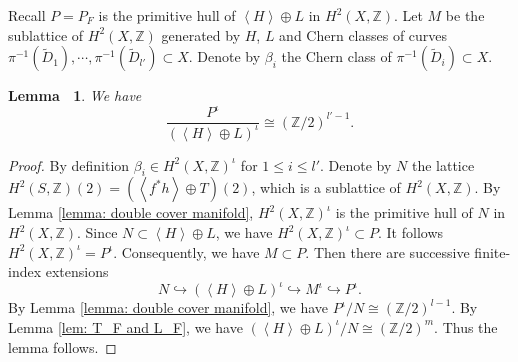 \documentclass[12pt,reqno,a4paper]{amsart}
\newtheorem{lem}[thm]{Lemma~}
\theoremstyle{remark}
\theoremstyle{definition}
\begin{document}
Recall $P=P_F$ is the primitive hull of $\left\langle H\right\rangle \oplus L$ in $H^2(X,\mathbb{Z})$.
Let $M$ be the sublattice of $H^2(X,\mathbb{Z})$ generated by $H$, $L$ and Chern classes of curves $\pi^{-1}(\widetilde{D}_1),\cdots, \pi^{-1}(\widetilde{D}_{l'}) \subset X$.
Denote by $\beta_i$ the Chern class of $\pi^{-1}(\widetilde{D}_i)\subset X$. 


        
\begin{lem}
\label{lem: saturation of inv part of P}
    We have
    \begin{equation*}
        \frac{P^{\iota}}{(\left\langle H \right\rangle\oplus L)^{\iota}} \cong (\mathbb{Z}/2)^{l'-1}.
    \end{equation*}
\end{lem}
\begin{proof}
By definition $\beta_i\in H^2(X, \mathbb{Z})^\iota$ for $1\le i\le l'$. 
Denote by $N$ the lattice $H^2(S,\mathbb{Z})(2)=(\left\langle f^*h \right\rangle \oplus T)(2)$, which is a sublattice of $H^2(X, \mathbb{Z})$.
By Lemma \ref{lemma: double cover manifold}, $H^2(X,\mathbb{Z})^{\iota}$ is the primitive hull of $N$ in $H^2(X, \mathbb{Z})$.
Since $N\subset \left\langle H\right\rangle \oplus L$, we have $H^2(X,\mathbb{Z})^{\iota}\subset P$. It follows $H^2(X,\mathbb{Z})^{\iota}=P^\iota$.
Consequently, we have $M\subset P$.
Then there are successive finite-index extensions
\begin{equation}
\label{eqn: iota-invariant successive saturations}
    N \hookrightarrow (\left\langle H \right\rangle\oplus L)^{\iota} \hookrightarrow M^{\iota} \hookrightarrow P^{\iota}.
\end{equation}
By Lemma \ref{lemma: double cover manifold}, we have $P^{\iota} / N\cong (\mathbb{Z}/2)^{l-1}$.
By Lemma \ref{lem: T_F and L_F}, we have $(\left\langle H \right\rangle\oplus L)^{\iota}/N \cong (\mathbb{Z}/2)^{m}$. 
Thus the lemma follows.
\end{proof}
\end{document}
